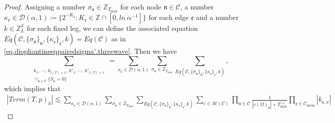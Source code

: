 \begin{proof}
Assigning a number $\sigma_{\mathfrak{n}}\in \mathbb{Z}_{T_{\text{max}}}$ for each node $\mathfrak{n}\in \mathcal{C}$, a number $\kappa_{\mathfrak{e}}\in \mathcal{D}(\alpha,1)\coloneqq\{2^{-K_{\mathfrak{e}}}:K_{\mathfrak{e}}\in  \mathbb{Z}\cap [0,ln\ \alpha^{-1}]\}$ for each edge $\mathfrak{e}$ and a number $k\in \mathbb{Z}^d_{L}$ for each fixed leg, we can define the associated equation $Eq(\mathcal{C}, \{\sigma_{\mathfrak{n}}\}_{\mathfrak{n}}, \{\kappa_{\mathfrak{e}}\}_{\mathfrak{e}},k)=Eq(\mathcal{C})$ as in \eqref{eq.diophantineeqpairedsigma'.threewave}. Then we have  
\begin{equation}\label{eq.termlemmaeq8.threewave}
    \sum_{\substack{k_1,\, \cdots,\, k_{l(T)+1},\, k'_1,\, \cdots,\, k'_{l(T)+1}\\\cap_{\mathfrak{n}\in \mathcal{C}} \{S_{\mathfrak{n}}=0\}}}=\sum_{\kappa_{\mathfrak{e}}\in \mathcal{D}(\alpha,1)}\sum_{\sigma_{\mathfrak{n}}\in \mathbb{Z}_{T_{\text{max}}}}\sum_{Eq(\mathcal{C}, \{\sigma_{\mathfrak{n}}\}_{\mathfrak{n}}, \{\kappa_{\mathfrak{e}}\}_{\mathfrak{e}},k)},
\end{equation}
which implies that
\begin{equation}\label{eq.termlemmaeq6.threewave}
\begin{split}
    |Term(T, p)_k|\lesssim \sum_{\kappa_{\mathfrak{e}}\in \mathcal{D}(\alpha,1)}\sum_{\sigma_{\mathfrak{n}}\in \mathbb{Z}_{T_{\text{max}}}}\sum_{Eq(\mathcal{C}, \{\sigma_{\mathfrak{n}}\}_{\mathfrak{n}}, \{\kappa_{\mathfrak{e}}\}_{\mathfrak{e}},k)} \sum_{c\in \mathscr{M}(\mathcal{C}) }\prod_{\mathfrak{n}\in \mathcal{C}}\frac{1}{|c(\Omega)_{\mathfrak{n}}|+T^{-1}_{\text{max}}} \prod_{\mathfrak{e}\in \mathcal{C}_{\text{norm}}}|k_{\mathfrak{e},x}|
\end{split}
\end{equation}


\end{proof}
